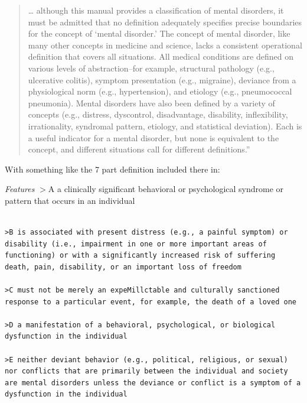 \begin{quote}

… although this manual provides a classification of mental disorders, it must be admitted that no definition adequately specifies precise boundaries for the concept of ‘mental disorder.’ The concept of mental disorder, like many other concepts in medicine and science, lacks a consistent operational definition that covers all situations. All medical conditions are defined on various levels of abstraction--for example, structural pathology (e.g., ulcerative colitis), symptom presentation (e.g., migraine), deviance from a physiological norm (e.g., hypertension), and etiology (e.g., pneumococcal pneumonia). Mental disorders have also been defined by a variety of concepts (e.g., distress, dyscontrol, disadvantage, disability, inflexibility, irrationality, syndromal pattern, etiology, and statistical deviation). Each is a useful indicator for a mental disorder, but none is equivalent to the concept, and different situations call for different definitions.” 
\end{quote}

With something like the 7 part definition included there in:

\emph{Features}
 $>$A a clinically significant behavioral or psychological syndrome or pattern that occurs in an individual

\begin{adjustwidth}{2.5em}{2.5em}
\begin{verbatim}

>B is associated with present distress (e.g., a painful symptom) or disability (i.e., impairment in one or more important areas of functioning) or with a significantly increased risk of suffering death, pain, disability, or an important loss of freedom

>C must not be merely an expeMillctable and culturally sanctioned response to a particular event, for example, the death of a loved one

>D a manifestation of a behavioral, psychological, or biological dysfunction in the individual

>E neither deviant behavior (e.g., political, religious, or sexual) nor conflicts that are primarily between the individual and society are mental disorders unless the deviance or conflict is a symptom of a dysfunction in the individual

\end{verbatim}
\end{adjustwidth}

